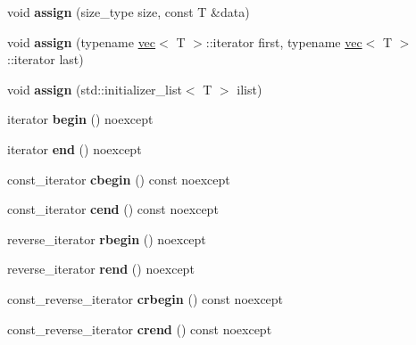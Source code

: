 \begin{DoxyCompactItemize}
void {\bfseries assign} (size\+\_\+type size, const T \&data)
\item 
\mbox{\label{classsc2d_1_1vec_a6e56c1055426cd82032aa24cd62586e6}} 
void {\bfseries assign} (typename \hyperlink{classsc2d_1_1vec}{vec}$<$ T $>$\+::iterator first, typename \hyperlink{classsc2d_1_1vec}{vec}$<$ T $>$\+::iterator last)
\item 
\mbox{\label{classsc2d_1_1vec_a8c96a9f298f50b7771fdd702f1e550e3}} 
void {\bfseries assign} (std\+::initializer\+\_\+list$<$ T $>$ ilist)
\item 
\mbox{\label{classsc2d_1_1vec_a1fe031bc1c9e337be5659e0ce9e2f94f}} 
iterator {\bfseries begin} () noexcept
\item 
\mbox{\label{classsc2d_1_1vec_a57bbe25b45f96c553b6777483016e0ce}} 
iterator {\bfseries end} () noexcept
\item 
\mbox{\label{classsc2d_1_1vec_a9aa99ff55102601946ba57a7a439b873}} 
const\+\_\+iterator {\bfseries cbegin} () const noexcept
\item 
\mbox{\label{classsc2d_1_1vec_a993f1b1b0afcd05c68f7aa3f02db7c9a}} 
const\+\_\+iterator {\bfseries cend} () const noexcept
\item 
\mbox{\label{classsc2d_1_1vec_a640d1aaa377f66df633d381797f706cc}} 
reverse\+\_\+iterator {\bfseries rbegin} () noexcept
\item 
\mbox{\label{classsc2d_1_1vec_aee893d81cabfc7e371f072ca2569843c}} 
reverse\+\_\+iterator {\bfseries rend} () noexcept
\item 
\mbox{\label{classsc2d_1_1vec_a39e8c5111a220b88ccd5de345ded8142}} 
const\+\_\+reverse\+\_\+iterator {\bfseries crbegin} () const noexcept
\item 
\mbox{\label{classsc2d_1_1vec_ac01b2e763a46984eefd2d7fb336960df}} 
const\+\_\+reverse\+\_\+iterator {\bfseries crend} () const noexcept
\item 
\mbox{\label{classsc2d_1_1vec_a64cb948512a741a434fd4959d73a12b9}} 

\end{DoxyCompactItemize}

